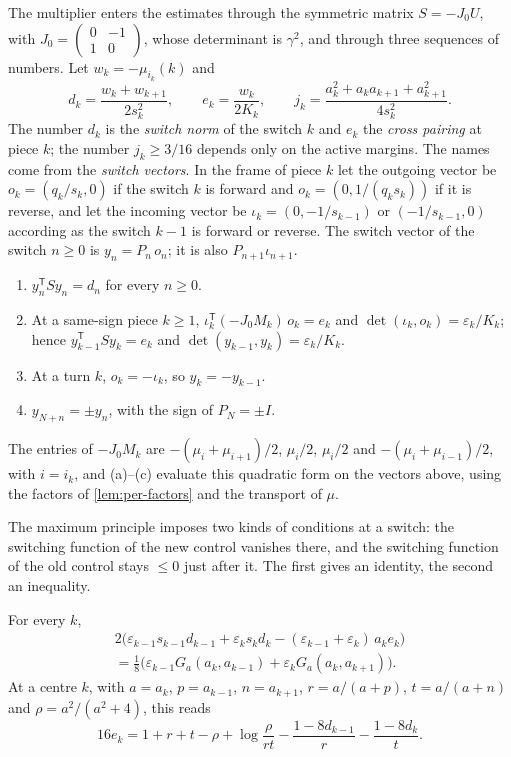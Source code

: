 The multiplier enters the estimates through the symmetric matrix $S=-J_0U$, with
$J_0=\left(\begin{smallmatrix}0&-1\\1&0\end{smallmatrix}\right)$,
whose determinant is $\gamma^2$, and through three sequences of numbers. Let
$w_k=-\mu_{i_k}(k)$ and
\[
  d_k=\frac{w_k+w_{k+1}}{2s_k^2},\qquad e_k=\frac{w_k}{2K_k},\qquad
  j_k=\frac{a_k^2+a_ka_{k+1}+a_{k+1}^2}{4s_k^2}.
\]
The number $d_k$ is the
\emph{switch norm} of the switch $k$ and $e_k$ the \emph{cross pairing} at piece $k$; the number
$j_k\ge3/16$ depends only on the active margins. The names come
from the \emph{switch vectors}. In the frame of piece $k$ let the outgoing vector be
$o_k=(q_k/s_k,0)$ if the switch $k$ is forward and $o_k=(0,1/(q_ks_k))$ if it is reverse, and let
the incoming vector be $\iota_k=(0,-1/s_{k-1})$ or $(-1/s_{k-1},0)$ according as the switch
$k-1$ is forward or reverse. The switch
vector of the switch $n\ge0$ is $y_n=P_n\,o_n$; it is also $P_{n+1}\iota_{n+1}$.

\begin{lemma}\label{lem:per-switch-vectors}
\begin{enumerate}[label=\textup{(\alph*)}]
\item $y_n^{\mathsf T}Sy_n=d_n$ for every $n\ge0$.
\item At a same-sign piece $k\ge1$, $\iota_k^{\mathsf T}(-J_0M_k)\,o_k=e_k$ and
  $\det(\iota_k,o_k)=\varepsilon_k/K_k$; hence $y_{k-1}^{\mathsf T}Sy_k=e_k$ and
  $\det(y_{k-1},y_k)=\varepsilon_k/K_k$.
\item At a turn $k$, $o_k=-\iota_k$, so $y_k=-y_{k-1}$.
\item $y_{N+n}=\pm y_n$, with the sign of $P_N=\pm I$.
\end{enumerate}
\end{lemma}

The entries of $-J_0M_k$ are $-(\mu_i+\mu_{i+1})/2$, $\mu_i/2$, $\mu_i/2$ and
$-(\mu_i+\mu_{i-1})/2$, with $i=i_k$, and (a)--(c) evaluate this quadratic form on the vectors
above, using the factors of \cref{lem:per-factors} and the transport of $\mu$.

The maximum principle imposes two kinds of conditions at a switch: the switching function of the
new control vanishes there, and the switching function of the old control stays $\le0$ just
after it. The first gives an identity, the second an inequality.

\begin{lemma}[Stationarity]\label{lem:stationarity}
For every $k$,
\begin{multline*}
  2\bigl(\varepsilon_{k-1}s_{k-1}d_{k-1}+\varepsilon_ks_kd_k
  -(\varepsilon_{k-1}+\varepsilon_k)\,a_ke_k\bigr)\\
  =\frac18\bigl(\varepsilon_{k-1}G_a(a_k,a_{k-1})+\varepsilon_kG_a(a_k,a_{k+1})\bigr).
\end{multline*}
At a centre $k$, with $a=a_k$, $p=a_{k-1}$, $n=a_{k+1}$,
$r=a/(a+p)$, $t=a/(a+n)$ and $\rho=a^2/(a^2+4)$, this reads
\[
  16e_k=1+r+t-\rho+\log\frac{\rho}{rt}-\frac{1-8d_{k-1}}{r}-\frac{1-8d_k}{t}.
\]
\end{lemma}

